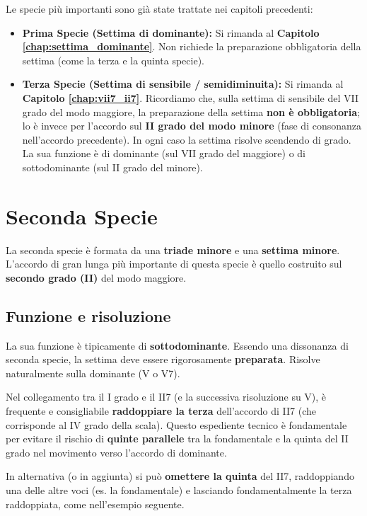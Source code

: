 Le specie più importanti sono già state trattate nei capitoli precedenti:

\begin{itemize}
    \item \textbf{Prima Specie (Settima di dominante):} Si rimanda al \textbf{Capitolo \ref{chap:settima_dominante}}. Non richiede la preparazione obbligatoria della settima (come la terza e la quinta specie).
    \item \textbf{Terza Specie (Settima di sensibile / semidiminuita):} Si rimanda al \textbf{Capitolo \ref{chap:vii7_ii7}}. Ricordiamo che, sulla settima di sensibile del VII grado del modo maggiore, la preparazione della settima \textbf{non è obbligatoria}; lo è invece per l'accordo sul \textbf{II grado del modo minore} (fase di consonanza nell'accordo precedente). In ogni caso la settima risolve scendendo di grado. La sua funzione è di dominante (sul VII grado del maggiore) o di sottodominante (sul II grado del minore).
\end{itemize}

\section{Seconda Specie}
\label{sec:seconda_specie_dettaglio}

La seconda specie è formata da una \textbf{triade minore} e una \textbf{settima minore}. L'accordo di gran lunga più importante di questa specie è quello costruito sul \textbf{secondo grado (II)} del modo maggiore.

\subsection{Funzione e risoluzione}
La sua funzione è tipicamente di \textbf{sottodominante}. Essendo una dissonanza di seconda specie, la settima deve essere rigorosamente \textbf{preparata}. Risolve naturalmente sulla dominante (V o V7).

\begin{regola}
    \label{reg:ii7_raddoppio}
    Nel collegamento tra il I grado e il II7 (e la successiva risoluzione su V), è frequente e consigliabile \textbf{raddoppiare la terza} dell'accordo di II7 (che corrisponde al IV grado della scala). Questo espediente tecnico è fondamentale per evitare il rischio di \textbf{quinte parallele} tra la fondamentale e la quinta del II grado nel movimento verso l'accordo di dominante.

	In alternativa (o in aggiunta) si può \textbf{omettere la quinta} del II7, raddoppiando una delle altre voci (es. la fondamentale) e lasciando fondamentalmente la terza raddoppiata, come nell'esempio seguente.
\end{regola}

